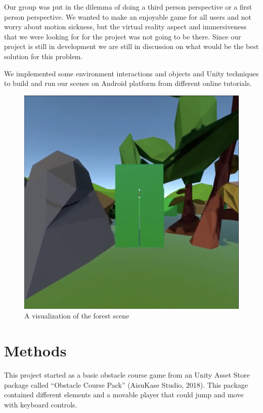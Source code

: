 \documentclass{vgtc}                          %
\begin{document}
Our group was put in the dilemma of doing a third person perspective or a first person perspective. We wanted to make an enjoyable game for all users and not worry about motion sickness, but the virtual reality aspect and immersiveness that we were looking for for the project was not going to be there. Since our project is still in development we are still in discussion on what would be the best solution for this problem.

We implemented some environment interactions and objects and Unity techniques to build and run our scenes on Android platform from different online tutorials.~\cite{youtube_2020}

\begin{figure}[tb]
  \centering %
  \includegraphics[width=\columnwidth]{forest.png}
  \caption{A visualization of the forest scene}
 \end{figure}

\section{Methods}
This project started as a basic obstacle course game from an Unity Asset Store package called “Obstacle Course Pack” (AisuKase Studio, 2018). This package contained different elements and a movable player that could jump and move with keyboard controls.
\end{document}
